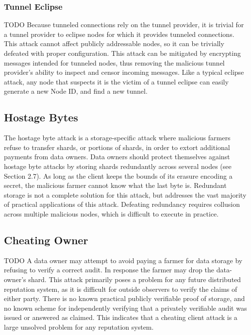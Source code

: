 \documentclass[a4paper,10pt]{article}
\newcommand{\todo}[1]{{\color{red} TODO #1}}
\begin{document}
\subsubsection{Tunnel Eclipse}

\todo{
Because tunneled connections rely on the tunnel provider, it is trivial for a
tunnel provider to eclipse nodes for which it provides tunneled connections.
This attack cannot affect publicly addressable nodes, so it can be trivially
defeated with proper configuration. This attack can be mitigated by encrypting
messages intended for tunneled nodes, thus removing the malicious tunnel
provider's ability to inspect and censor incoming messages. Like a typical
eclipse attack, any node that suspects it is the victim of a tunnel eclipse can
easily generate a new Node ID, and find a new tunnel.
}

\subsection{Hostage Bytes}

The hostage byte attack is a storage-specific attack where malicious farmers
refuse to transfer shards, or portions of shards, in order to extort additional
payments from data owners. Data owners should protect themselves against hostage
byte attacks by storing shards redundantly across several nodes (see Section
2.7). As long as the client keeps the bounds of its erasure encoding a secret,
the malicious farmer cannot know what the last byte is. Redundant storage is not
a complete solution for this attack, but addresses the vast majority of
practical applications of this attack. Defeating redundancy requires collusion
across multiple malicious nodes, which is difficult to execute in practice.

\subsection{Cheating Owner}

\todo{
A data owner may attempt to avoid paying a farmer for data storage by refusing
to verify a correct audit. In response the farmer may drop the data-owner’s
shard. This attack primarily poses a problem for any future distributed
reputation system, as it is difficult for outside observers to verify the claims
of either party. There is no known practical publicly verifiable proof of
storage, and no known scheme for independently verifying that a privately
verifiable audit was issued or answered as claimed. This indicates that a
cheating client attack is a large unsolved problem for any reputation system.
}
\end{document}
